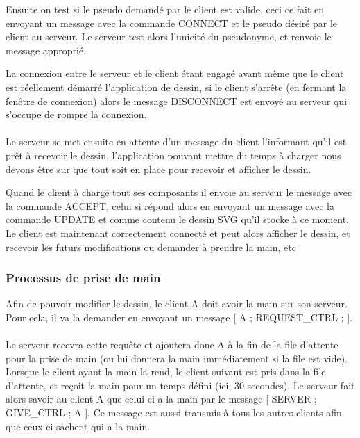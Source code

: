 \documentclass[a4paper,11pt]{article}
\begin{document}
Ensuite on test si le pseudo demandé par le client est valide, ceci ce fait en envoyant un message avec la commande CONNECT et le pseudo désiré par le client au serveur. Le serveur test alors l'unicité du pseudonyme, et renvoie le message approprié.

La connexion entre le serveur et le client étant engagé avant même que le client est réellement démarré l'application de dessin, si le client s'arrête (en fermant la fenêtre de connexion) alors le message DISCONNECT est envoyé au serveur qui s'occupe de rompre la connexion.


\paragraph{} Le serveur se met ensuite en attente d'un message du client l'informant qu'il est prêt à recevoir le dessin, l'application pouvant mettre du temps à charger nous devons être sur que tout soit en place pour recevoir et afficher le dessin.

Quand le client à chargé tout ses composants il envoie au serveur le message avec la commande ACCEPT, celui si répond alors en envoyant un message avec la commande UPDATE et comme contenu le dessin SVG qu'il stocke à ce moment. Le client est maintenant correctement connecté et peut alors afficher le dessin, et recevoir les futurs modifications ou demander à prendre la main, etc

\subsubsection{Processus de prise de main}
Afin de pouvoir modifier le dessin, le client A doit avoir la main sur son serveur. Pour cela, il va la demander en envoyant un message [ A ; REQUEST\_CTRL ; ].

\paragraph{} Le serveur recevra cette requête et ajoutera donc A à la fin de la file d'attente pour la prise de main (ou lui donnera la main immédiatement si la file est vide). Lorsque le client ayant la main la rend, le client suivant est pris dans la file d'attente, et reçoit la main pour un temps défini (ici, 30 secondes). Le serveur fait alors savoir au client A que celui-ci a la main par le message [ SERVER ; GIVE\_CTRL ; A ]. Ce message est aussi transmis à tous les autres clients afin que ceux-ci sachent qui a la main.
\end{document}
